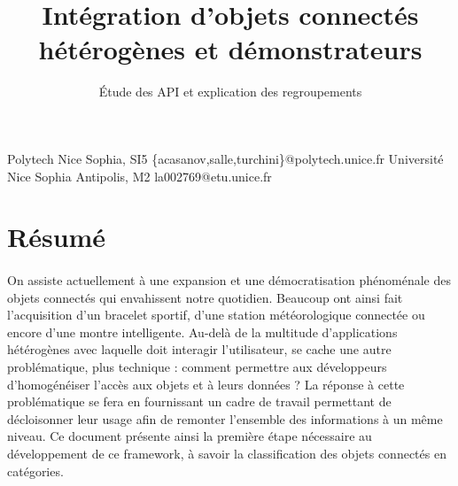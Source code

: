 \documentclass[nocopyrightspace]{sigplanconf}
\begin{document}
\setlength{\pdfpageheight}{\paperheight}
\setlength{\pdfpagewidth}{\paperwidth}





\title{Intégration d’objets connectés hétérogènes et démonstrateurs}
\subtitle{Étude des API et explication des regroupements}

           {Polytech Nice Sophia, SI5}
           {\{acasanov,salle,turchini\}@polytech.unice.fr}
           {Université Nice Sophia Antipolis, M2}
           {la002769@etu.unice.fr}

\maketitle


\section*{Résumé}
	\paragraph{}
	On assiste actuellement à une expansion et une démocratisation phénoménale des objets connectés qui envahissent notre quotidien. Beaucoup ont ainsi fait l’acquisition d’un bracelet sportif, d’une station météorologique connectée ou encore d’une montre intelligente. Au-delà de la multitude d’applications hétérogènes avec laquelle doit interagir l’utilisateur, se cache une autre problématique, plus technique : comment permettre aux développeurs d’homogé\-néiser l’accès aux objets et à leurs données ? La réponse à cette problématique se fera en fournissant un cadre de travail permettant de décloisonner leur usage afin de remonter l’ensemble des informations à un même niveau. Ce document présente ainsi la première étape nécessaire au développement de ce framework, à savoir la classification des objets connectés en catégories.
\end{document}
